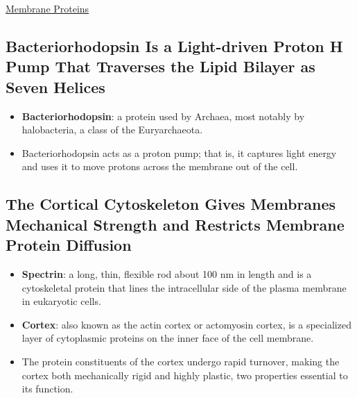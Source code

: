 \documentclass[12pt,letterpaper]{article}
\begin{document}
\begin{secbox}{\hyperlink{10}{Membrane Proteins}}
{    \subsection*{Bacteriorhodopsin Is a Light-driven Proton H\bfg{^+} Pump That
    Traverses the Lipid Bilayer as Seven \bfg{\alpha} Helices}
    \begin{itemize}
        \item \textbf{Bacteriorhodopsin}: a protein used by Archaea, most notably by halobacteria, a class of the Euryarchaeota.
        \item Bacteriorhodopsin acts as a proton pump; that is, it captures light energy and uses it to move protons across the membrane out of the cell.
    \end{itemize}

    \subsection*{The Cortical Cytoskeleton Gives Membranes Mechanical Strength and Restricts Membrane Protein Diffusion}
    \begin{itemize}
        \item \textbf{Spectrin}: a long, thin, flexible rod about 100 nm in length and is a cytoskeletal protein that lines the intracellular side of the plasma membrane in eukaryotic cells.  
        \item \textbf{Cortex}: also known as the actin cortex or actomyosin cortex, is a specialized layer of cytoplasmic proteins on the inner face of the cell membrane.
        \item The protein constituents of the cortex undergo rapid turnover, making the cortex both mechanically rigid and highly plastic, two properties essential to its function.
    \end{itemize}

}
\end{secbox}
\end{document}
